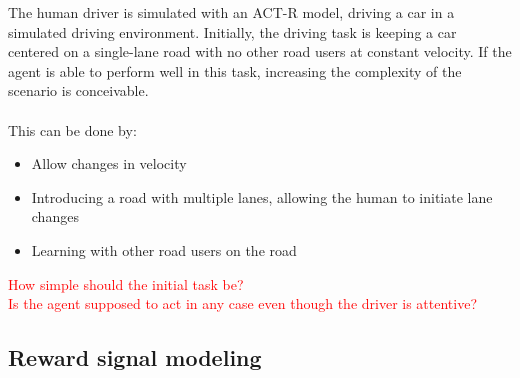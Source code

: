 The human driver is simulated with an ACT-R model, driving a car in a simulated driving environment. Initially, the driving task is keeping a car centered on a single-lane road with no other road users at constant velocity. If the agent is able to perform well in this task, increasing the complexity of the scenario is conceivable.\\
\\
This can be done by:
\begin{itemize}[noitemsep]
    \item Allow changes in velocity
    \item Introducing a road with multiple lanes, allowing the human to initiate lane changes
    \item Learning with other road users on the road
\end{itemize}
\textcolor{red}{How simple should the initial task be?}\\
\textcolor{red}{Is the agent supposed to act in any case even though the driver is attentive?}

\subsection{Reward signal modeling}

